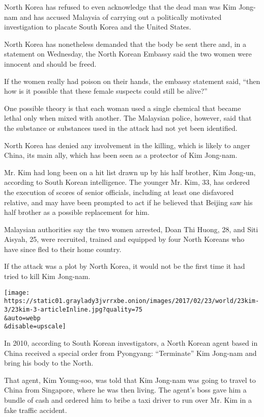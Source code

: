 North Korea has refused to even acknowledge that the dead man was Kim
Jong-nam and has accused Malaysia of carrying out a politically
motivated investigation to placate South Korea and the United States.

North Korea has nonetheless demanded that the body be sent there and, in
a statement on Wednesday, the North Korean Embassy said the two women
were innocent and should be freed.

If the women really had poison on their hands, the embassy statement
said, ``then how is it possible that these female suspects could still
be alive?''

One possible theory is that each woman used a single chemical that
became lethal only when mixed with another. The Malaysian police,
however, said that the substance or substances used in the attack had
not yet been identified.

North Korea has denied any involvement in the killing, which is likely
to anger China, its main ally, which has been seen as a protector of Kim
Jong-nam.

Mr. Kim had long been on a hit list drawn up by his half brother, Kim
Jong-un, according to South Korean intelligence. The younger Mr. Kim,
33, has ordered the execution of scores of senior officials, including
at least one disfavored relative, and may have been prompted to act if
he believed that Beijing saw his half brother as a possible replacement
for him.

Malaysian authorities say the two women arrested, Doan Thi Huong, 28,
and Siti Aisyah, 25, were recruited, trained and equipped by four North
Koreans who have since fled to their home country.

If the attack was a plot by North Korea, it would not be the first time
it had tried to kill Kim Jong-nam.

\texttt{[image: https://static01.graylady3jvrrxbe.onion/images/2017/02/23/world/23kim-3/23kim-3-articleInline.jpg?quality=75\\\&auto=webp\\\&disable=upscale]}

In 2010, according to South Korean investigators, a North Korean agent
based in China received a special order from Pyongyang: ``Terminate''
Kim Jong-nam and bring his body to the North.

That agent, Kim Young-soo, was told that Kim Jong-nam was going to
travel to China from Singapore, where he was then living. The agent's
boss gave him a bundle of cash and ordered him to bribe a taxi driver to
run over Mr. Kim in a fake traffic accident.

